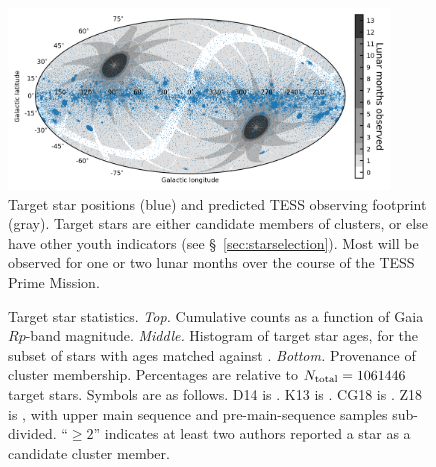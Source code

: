 \documentclass[12pt,twocolumn,tighten]{aastex62}
\begin{document}
\begin{figure}[!t]
	\begin{center}
		\leavevmode
		\includegraphics[width=0.9\textwidth]{target_star_positions.png}
	\end{center}
	\vspace{-0.8cm}
	\caption{
    Target star positions (blue) and predicted TESS observing
    footprint (gray).  Target stars are either candidate members of
    clusters, or else have other youth indicators (see
    \S~\ref{sec:starselection}).  Most will be observed for one or two
    lunar months over the course of the TESS Prime Mission.
    \label{fig:cdips_targets_positions}
	}
\end{figure}

\begin{figure}[!t]
	\begin{center}
		\leavevmode
		\vspace{-0.8cm}
		\vspace{-0.8cm}
	\end{center}
	\vspace{-0.8cm}
	\caption{
		Target star statistics.
		{\it Top.} Cumulative counts as a function of Gaia $Rp$-band
		magnitude.  
		{\it Middle.} Histogram of target star ages, for the subset of
		stars with ages matched against \citet{Kharchenko_et_al_2013}.
		{\it Bottom.} Provenance of cluster membership.  Percentages are
		relative to $N_{\rm total}=1061446$ target stars. Symbols
		are as follows.
		D14 is \citet{dias_proper_2014}.
		K13 is \citet{Kharchenko_et_al_2013}.
		CG18 is \citet{cantat-gaudin_gaia_2018}.
		Z18 is \citet{zari_3d_2018}, with upper main sequence and
		pre-main-sequence samples sub-divided.
		``$\geq 2$'' indicates at least two authors reported a star as a
		candidate cluster member.
		\label{fig:cdips_targets}
	}
\end{figure}
\end{document}
